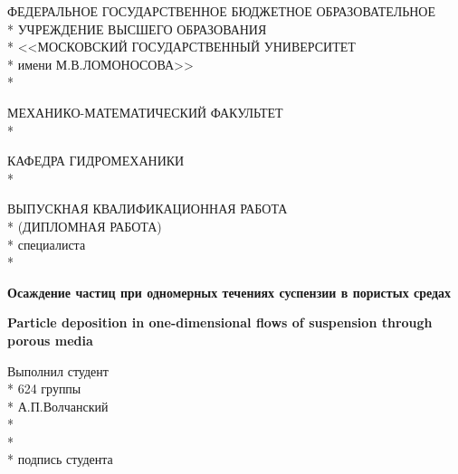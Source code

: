\documentclass[a4paper,14pt]{article}
\begin{document}
\begin{titlepage}
\begin{center}
ФЕДЕРАЛЬНОЕ ГОСУДАРСТВЕННОЕ БЮДЖЕТНОЕ ОБРАЗОВАТЕЛЬНОЕ \\*
УЧРЕЖДЕНИЕ ВЫСШЕГО ОБРАЗОВАНИЯ \\*
<<МОСКОВСКИЙ ГОСУДАРСТВЕННЫЙ УНИВЕРСИТЕТ \\*
имени М.В.ЛОМОНОСОВА>> \\*
\end{center}

\begin{center}
МЕХАНИКО-МАТЕМАТИЧЕСКИЙ ФАКУЛЬТЕТ \\*
\end{center}

\begin{center}
КАФЕДРА ГИДРОМЕХАНИКИ \\*
\end{center}

\begin{center}
\vspace{2cm}
ВЫПУСКНАЯ КВАЛИФИКАЦИОННАЯ РАБОТА \\*
(ДИПЛОМНАЯ РАБОТА) \\*
специалиста \\*
\end{center}

\begin{center}
\Large \textbf{Осаждение частиц при одномерных течениях суспензии в пористых средах}
\end{center}

\begin{center}
\Large \textbf{Particle deposition in one-dimensional flows of suspension through porous media}
\end{center}

\vspace{1cm}

\begin{flushright}
\begin{minipage}{10cm}
Выполнил студент \\*
624 группы \\*
А.П.Волчанский \\*
\vspace{1cm} \\*
\underline{\hspace{2in}} \\*
подпись студента\\
\end{minipage}
\end{flushright}


\end{titlepage}
\end{document}

